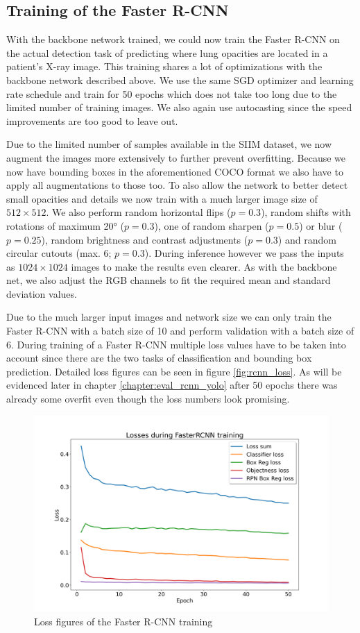 \subsection*{Training of the Faster R-CNN}

With the backbone network trained, we could now train the Faster R-CNN on the actual detection task of predicting where lung opacities are located in a patient's X-ray image. This training shares a lot of optimizations with the backbone network described above. We use the same \ac{SGD} optimizer and learning rate schedule and train for 50 epochs which does not take too long due to the limited number of training images. We also again use autocasting since the speed improvements are too good to leave out.

Due to the limited number of samples available in the SIIM dataset, we now augment the images more extensively to further prevent overfitting. Because we now have bounding boxes in the aforementioned \ac{COCO} format we also have to apply all augmentations to those too. To also allow the network to better detect small opacities and details we now train with a much larger image size of $512 \times 512$. We also perform random horizontal flips ($p=0.3$), random shifts with rotations of maximum 20° ($p=0.3$), one of random sharpen ($p=0.5$) or blur ($p=0.25$), random brightness and contrast adjustments ($p=0.3$) and random circular cutouts (max. 6; $p=0.3$). During inference however we pass the inputs as $1024 \times 1024$ images to make the results even clearer. As with the backbone net, we also adjust the RGB channels to fit the required mean and standard deviation values.

Due to the much larger input images and network size we can only train the Faster R-CNN with a batch size of 10 and perform validation with a batch size of 6. During training of a Faster R-CNN multiple loss values have to be taken into account since there are the two tasks of classification and bounding box prediction. Detailed loss figures can be seen in figure \vref{fig:rcnn_loss}. As will be evidenced later in chapter \vref{chapter:eval_rcnn_yolo} after 50 epochs there was already some overfit even though the loss numbers look promising.

\begin{figure}
	\centering
	\includegraphics[width=.7\linewidth]{img/loss_fasterrcnn_50.png}
	\caption{Loss figures of the Faster R-CNN training}
	\label{fig:rcnn_loss}
\end{figure}

